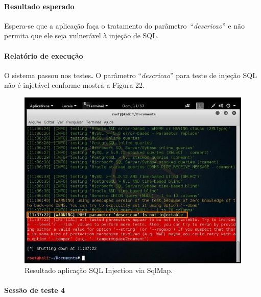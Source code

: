 \documentclass[
    12pt,               %
    openright,          %
    oneside,            %
    a4paper,            %
    section=TITLE,     %
    english,            %
    french,             %
    spanish,            %
    brazil              %
    ]{abntex2}
\begin{document}



\paragraph*{Resultado esperado}

Espera-se que a aplicação faça o tratamento do parâmetro~\textquotedblleft{}\emph{descricao}\textquotedblright{} e não permita que ele seja vulnerável à injeção de SQL.



\paragraph*{Relatório de execução}

O sistema passou nos testes\textbf{.} O parâmetro \textquotedblleft{}\emph{descricao}\textquotedblright{} para teste de injeção SQL não é injetável conforme mostra a Figura 22.





\begin{figure}[htp]
\centering
\caption{Resultado aplicação SQL Injection via SqlMap.}
\includegraphics[width=450px]{image18.jpeg}
\end{figure}
\ifdefined\FloatBarrier \FloatBarrier \fi





\paragraph*{Sessão de teste 4}
\end{document}

